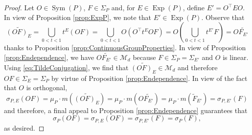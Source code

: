 \documentclass[11pt]{article}
\newcommand\Sym{\operatorname{Sym}}
\newcommand\Exp{\operatorname{Exp}}
\begin{document}
\begin{proof}
Let $O\in\Sym(P)$, $F\in\Sigma_P$ and, for $E\in \Exp(P)$, define $E'=O^\top EO$. In view of Proposition \ref{prop:ExpP}, we note that $E'\in \Exp(P)$. Observe that
\begin{equation}\label{eq:TildeConjugation}
    \widetilde{(OF)_E}=\bigcup_{0<t<1}t^E (OF)=\bigcup_{0<t<1}O\left(O^\top t^E O F\right)=O\left(\bigcup_{0<t<1} t^{E'}F\right)=O \widetilde{F_{E'}}
\end{equation}
thanks to Proposition \ref{prop:ContinuousGroupProperties}.
In view of Proposition \ref{prop:Endependence}, we have $O\widetilde{F_{E'}}\in \mathcal{M}_d$ because $F\in \Sigma_P=\Sigma_{E'}$ and $O$ is linear. Using \eqref{eq:TildeConjugation}, we find that $\widetilde{(OF)_E}\in\mathcal{M}_d$ and therefore  $OF\in\Sigma_E=\Sigma_P$ by virtue of Proposition \ref{prop:Endependence}. In view of the fact that $O$ is orthogonal,
\begin{equation*}
\sigma_{P,E}(OF)=\mu_P\cdot m\left(\widetilde{(OF)_E}\right)=\mu_P\cdot m\left(O \widetilde{F_{E'}}\right)=\mu_P\cdot m\left(\widetilde{F}_{E'}\right)=\sigma_{P,E'}(F)
\end{equation*}
and therefore, a final appeal to Proposition \ref{prop:Endependence} guarantees that
\begin{equation*}
    \sigma_P(OF)=\sigma_{P,E}(OF)=\sigma_{P,E'}(F)=\sigma_P(F),
\end{equation*}
as desired.
\begin{comment}
Consider the measure spaces constructed from $E$ and $E'$ respectively: $(S, \Sigma_{S,E},\sigma_E)$ and $(S,\Sigma_{S,E'},\sigma_{E'})$. By virtue of Proposition \ref{prop:Endependence}, these measure spaces are the same, i.e., $\Sigma_{S,E} = \Sigma_{S,E'}$ and $\sigma_{E} = \sigma_{E'}$. For convenience, let us call these equivalent measure spaces the triple $(S,\Sigma_S,\sigma)$. 


\end{comment}
\end{proof}
\end{document}
